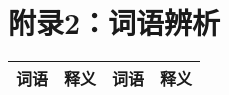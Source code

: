 \section{附录2：词语辨析}

\begin{longtable}{|p{}|p{}|p{}|p{}|}
    \hline
    \textbf{词语} & \textbf{释义} & \textbf
    {词语}        & \textbf{释义}                         \\
    \hline
\end{longtable}